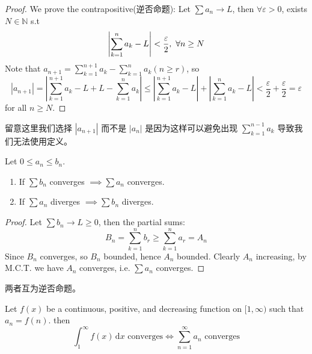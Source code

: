 \documentclass[
	UTF-8,
	11pt, %
	a4paper, %
]{LegrandOrangeBook}
\begin{document}
    \begin{proof}
        We prove the contrapositive(逆否命题): Let $\sum a_n \to L$, then $\forall \varepsilon >0$, exists $N \in \mathbb{N}$ s.t
        $$
            \left| \sum_{k = 1}^{n}a_k - L \right| < {\varepsilon \over 2} ,\ \forall n \geq N
        $$
        Note that $a_{n+1} = \sum_{k = 1}^{n+1} a_k - \sum_{k = 1}^{n} a_k (n \geq r)$, so 
        $$
            |a_{n+1}| = \left| \sum_{k = 1}^{n+1} a_k -L +L - \sum_{k = 1}^{n} a_k \right| \leq 
            \left| \sum_{k = 1}^{n+1} a_k -L\right| + \left|\sum_{k = 1}^{n} a_k -L \right|
            < \frac{\varepsilon}{2}+\frac{\varepsilon}{2} = \varepsilon
        $$
        for all $n\geq N$.
    \end{proof}
    
        \begin{remark}
            留意这里我们选择 $|a_{n+1}|$ 而不是 $|a_n|$ 是因为这样可以避免出现 $\sum_{k = 1}^{n-1}a_k$ 导致我们无法使用定义。
        \end{remark}

    \begin{theorem}
        Let $0 \le a_n \le b_n$.
        \begin{enumerate}
            \item If $\sum b_n$ converges $\implies \sum a_n$ converges.
            \item If $\sum a_n$ diverges $\implies \sum b_n$ diverges.
        \end{enumerate}
    \end{theorem}

    \begin{proof}
        Let $\sum b_n \to L \geq 0$, then the partial sums:
        $$
            B_n = \sum_{k = 1}^{n} b_r \geq \sum_{k = 1}^{n} a_r = A_n
        $$
        Since $B_n$ converges, so $B_n$ bounded, hence $A_n$ bounded. Clearly $A_n$ increasing, 
        by M.C.T. we have $A_n$ converges, i.e. $\sum a_n$ converges. 
    \end{proof}

    \begin{remark}
        两者互为逆否命题。
    \end{remark}

    \newcommand{\diffd}{\, \mathrm{d}}

    \begin{theorem}
        Let $f(x)$ be a continuous, positive, and decreasing function on $[1, \infty)$ such that $a_n = f(n)$.
        then 
        $$
        \int_1^{\infty} f(x) \diffd x \text{ converges} \iff \sum_{n=1}^{\infty} a_n \text{ converges}
        $$
    \end{theorem}
\end{document}
